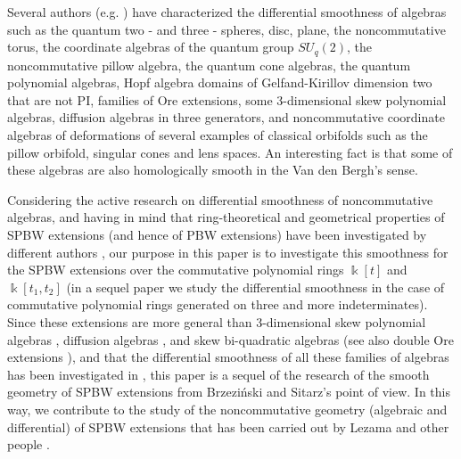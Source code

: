 \documentclass{amsart}
\theoremstyle{definition}
\theoremstyle{remark}
\numberwithin{equation}{section}
\begin{document}
Several authors (e.g. \cite{Brzezinski2015, Brzezinski2016, BrzezinskiElKaoutitLomp2010, BrzezinskiLomp2018, BrzezinskiSitarz2017, DuboisVioletteKernerMadore1990, Karacuha2015, KaracuhaLomp2014, ReyesSarmiento2022}) have characterized the differential smoothness of algebras such as the quantum two - and three - spheres, disc, plane, the noncommutative torus, the coordinate algebras of the quantum group $SU_q(2)$, the noncommutative pillow algebra, the quantum cone algebras, the quantum polynomial algebras, Hopf algebra domains of Gelfand-Kirillov dimension two that are not PI, families of Ore extensions, some 3-dimensional skew polynomial algebras, diffusion algebras in three generators, and noncommutative coordinate algebras of deformations of several examples of classical orbifolds such as the pillow orbifold, singular cones and lens spaces. An interesting fact is that some of these algebras are also homologically smooth in the Van den Bergh's sense.

Considering the active research on differential smoothness of noncommutative algebras, and having in mind that ring-theoretical and geometrical properties of SPBW extensions (and hence of PBW extensions) have been investigated by different authors \cite{AbdiTalebi2023, Artamonov2015, GomezTorrecillas2014, Fajardoetal2020, Hamidizadehetal2020, HashemiKhalilnezhadAlhevaz2017, HigueraReyes2023, LezamaGomez2019, NinoRamirezReyes2020, ReyesRodriguez2021, ReyesSuarez2020, SuarezReyesSuarez2023, Tumwesigyeetal2020}, our purpose in this paper is to investigate this smoothness for the SPBW extensions over the commutative polynomial rings $\Bbbk[t]$ and $\Bbbk[t_1, t_2]$ (in a sequel paper \cite{RubianoReyes2024DSSPBWKt3n} we study the differential smoothness in the case of commutative polynomial rings generated on three and more indeterminates). Since these extensions are more general than 3-dimensional skew polynomial algebras \cite{BellSmith1990}, diffusion algebras \cite{IsaevPyatovRittenberg2001}, and skew bi-quadratic algebras \cite{Bavula2023} (see also double Ore extensions \cite{ZhangZhang2008, ZhangZhang2009}), and that the differential smoothness of all these families of algebras has been investigated in \cite{ReyesSarmiento2022, RubianoReyes2024DSBiquadraticAlgebras, RubianoReyes2024DSDoubleOreExtensions}, this paper is a sequel of the research of the smooth geometry of SPBW extensions from Brzezi{\'n}ski and Sitarz's point of view. In this way, we contribute to the study of the noncommutative geometry (algebraic and differential) of SPBW extensions that has been carried out by Lezama \cite{Lezama2020, Lezama2021, LezamaGomez2019, LezamaLatorre2017} and other people \cite{ChaconReyes2024, NinoReyes2024, ReyesSuarez2016, SuarezReyesSuarez2023}. 
 
\end{document}
